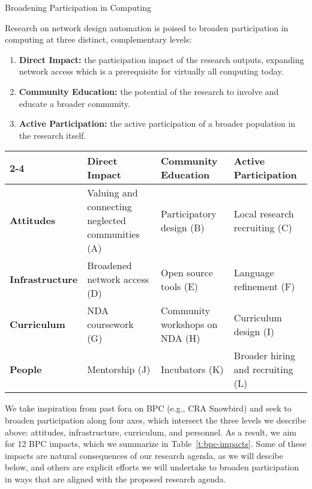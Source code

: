 \documentclass[10pt]{article}
\begin{document}
 \begin{Large}
\begin{center}
Broadening Participation in Computing
\end{center}
\end{Large}

Research on network design automation is poised to broaden participation in computing at three distinct, complementary levels:
\begin{enumerate}
\item \textbf{Direct Impact:} the participation impact of the research outputs, expanding network access which is a prerequisite for virtually all computing today.
\item \textbf{Community Education:} the potential of the research to involve and educate a broader community.
\item \textbf{Active Participation:} the active participation of a broader population in the research itself.
\end{enumerate}

\begin{table*}
\centering
\begin{tabular}{l|p{1.6in}|p{1.6in}|p{1.6in}|}
\cline{2-4}
 & \textbf{Direct Impact} & \textbf{Community Education} & \textbf{Active Participation} \\ \hline
\multicolumn{1}{|l|}{\textbf{Attitudes}} & Valuing and connecting neglected communities (A) & Participatory design (B) & Local research recruiting (C) \\ \hline
\multicolumn{1}{|l|}{\textbf{Infrastructure}} & Broadened network access (D) & Open source tools (E) & Language refinement (F) \\ \hline
\multicolumn{1}{|l|}{\textbf{Curriculum}} & NDA coursework (G) & Community workshops on NDA (H) & Curriculum design (I) \\ \hline
\multicolumn{1}{|l|}{\textbf{People}} & Mentorship (J) & Incubators (K) & Broader hiring and recruiting (L) \\ \hline
\end{tabular}
\caption{NDA Broadening Participation Activities.}
\label{t:bpc-impacts}
\end{table*}

We take inspiration from past fora on BPC (e.g., CRA Snowbird) and seek to broaden participation along four axes, which intersect the three levels we describe above: attitudes, infrastructure, curriculum, and personnel.  As a result, we aim for 12 BPC impacts, which we summarize in Table~\ref{t:bpc-impacts}.  Some of these impacts are natural consequences of our research agenda, as we will descibe below, and others are explicit efforts we will undertake to broaden participation in ways that are aligned with the proposed research agenda.
\end{document}
